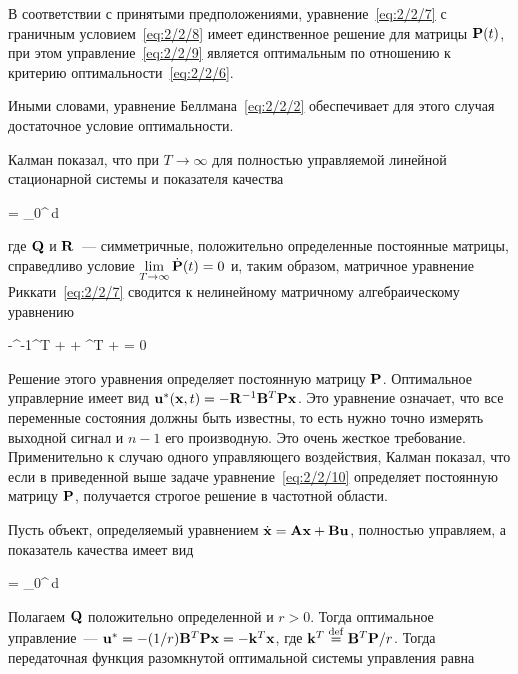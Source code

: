     В соответствии с принятыми предположениями, уравнение~\ref{eq:2/2/7} с граничным условием~\ref{eq:2/2/8} имеет единственное решение для матрицы $\mathbf{P}(t)$, при этом управление~\ref{eq:2/2/9} является оптимальным по отношению к критерию оптимальности~\vref{eq:2/2/6}.
\eteo

Иными словами, уравнение Беллмана~\vref{eq:2/2/2} обеспечивает для этого случая достаточное условие оптимальности.

\br

Калман\cite{KALMAN1} показал, что при $T \to \infty$ для полностью управляемой линейной стационарной системы и показателя качества

\beqn
    \funcF =  \int\limits_0^\infty {}\,d\tau \text{,}
\eeqn

где $\mathbf{Q}$ и $\mathbf{R}$~--- симметричные, положительно определенные постоянные матрицы, справедливо условие $\lim\limits_{T \to \infty}\dot{\mathbf{P}}(t) = 0$ и, таким образом, матричное уравнение Риккати~\ref{eq:2/2/7} сводится к нелинейному матричному алгебраическому уравнению

    -^{-1}^T +  + ^T +  = 0 
\eeq

Решение этого уравнения определяет постоянную матрицу $\mathbf{P}$. Оптимальное управлерние имеет вид ${\mathbf{u}^{*}}(\mathbf{x}, t) = -\mathbf{R}^{-1}\mathbf{B}^T\mathbf{P} \mathbf{x}$. Это уравнение означает, что все переменные состояния должны быть известны, то есть нужно точно измерять выходной сигнал и $n-1$ его производную. Это очень жесткое требование. Применительно к случаю одного управляющего воздействия, Калман\cite{KALMAN2} показал, что если в приведенной выше задаче уравнение~\ref{eq:2/2/10} определяет постоянную матрицу $\mathbf{P}$, получается строгое решение в частотной области.

\br

Пусть объект, определяемый уравнением $\dot{\mathbf{x}} = \mathbf{A}\mathbf{x} + \mathbf{B} \mathbf{u}$, полностью управляем, а показатель качества имеет вид

    \funcF =  \int\limits_0^\infty {}\,d\tau {}
\eeq

Полагаем $\mathbf{Q}$ положительно определенной и $r > 0$. Тогда оптимальное управление~--- ${\mathbf{u}^{*}} = -(1/r) \mathbf{B}^T\mathbf{P} \mathbf{x} = -\mathbf{k}^T\mathbf{x}$, где $\mathbf{k}^T \stackrel{ \mathrm{def} }{=} \mathbf{B}^T\mathbf{P} / r$. Тогда передаточная функция разомкнутой оптимальной системы управления равна\cite{XU}

